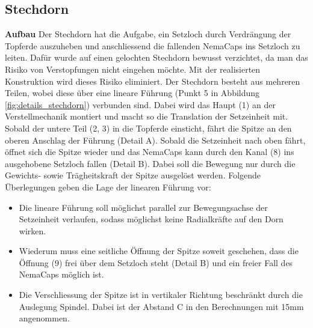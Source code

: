 \subsection{Stechdorn}

\textbf{Aufbau}
Der Stechdorn hat die Aufgabe, ein Setzloch durch Verdrängung der Topferde auszuheben und anschliessend die fallenden NemaCaps ins Setzloch zu leiten. Dafür wurde auf einen gelochten Stechdorn bewusst verzichtet, da man das Risiko von Verstopfungen nicht eingehen möchte. Mit der realisierten Konstruktion wird dieses Risiko eliminiert. 
\newline
Der Stechdorn besteht aus mehreren Teilen, wobei diese über eine lineare Führung (Punkt 5 in Abbildung \ref{fig:details_stechdorn}) verbunden sind. Dabei wird das Haupt (1) an der Verstellmechanik montiert und macht so die Translation der Setzeinheit mit. Sobald der untere Teil (2, 3) in die Topferde einsticht, fährt die Spitze an den oberen Anschlag der Führung (Detail A). Sobald die Setzeinheit nach oben fährt, öffnet sich die Spitze wieder und das NemaCaps kann durch den Kanal (8) ins ausgehobene Setzloch fallen (Detail B). Dabei soll die Bewegung nur durch die Gewichts- sowie Trägheitskraft der Spitze ausgelöst werden.
\newline
Folgende Überlegungen geben die Lage der linearen Führung vor:
\begin{itemize}
	\item Die lineare Führung soll möglichst parallel zur Bewegungsachse der Setzeinheit verlaufen, sodass möglichst keine Radialkräfte auf den Dorn wirken.
	
	\item Wiederum muss eine seitliche Öffnung der Spitze soweit geschehen, dass die Öffnung (9) frei über dem Setzloch steht (Detail B) und ein freier Fall des NemaCaps möglich ist.
	
	\item Die Verschliessung der Spitze ist in vertikaler Richtung beschränkt durch die Auslegung Spindel. Dabei ist der Abstand C in den Berechnungen mit 15mm angenommen.
\end{itemize}
